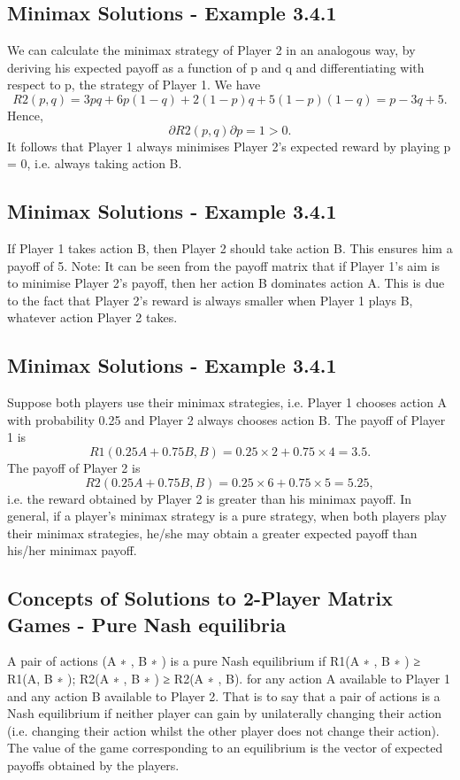 \documentclass[]{report}
\begin{document}
\subsection{Minimax Solutions - Example 3.4.1}
We can calculate the minimax strategy of Player 2 in an analogous
way, by deriving his expected payoff as a function of p and q and
differentiating with respect to p, the strategy of Player 1. We have
\[R2(p, q) = 3pq+6p(1−q)+2(1−p)q+5(1−p)(1−q) = p−3q+5.\]
Hence,
\[∂R2(p, q)
∂p
= 1 > 0.\]
It follows that Player 1 always minimises Player 2’s expected
reward by playing p = 0, i.e. always taking action B.
\subsection{Minimax Solutions - Example 3.4.1}
If Player 1 takes action B, then Player 2 should take action B.
This ensures him a payoff of 5.
Note: It can be seen from the payoff matrix that if Player 1’s aim
is to minimise Player 2’s payoff, then her action B dominates
action A.
This is due to the fact that Player 2’s reward is always smaller
when Player 1 plays B, whatever action Player 2 takes.
\subsection{Minimax Solutions - Example 3.4.1}
Suppose both players use their minimax strategies, i.e. Player 1
chooses action A with probability 0.25 and Player 2 always chooses
action B.
The payoff of Player 1 is
\[R1(0.25A + 0.75B, B) = 0.25 × 2 + 0.75 × 4 = 3.5.\]
The payoff of Player 2 is
\[R2(0.25A + 0.75B, B) = 0.25 × 6 + 0.75 × 5 = 5.25,\] i.e. the
reward obtained by Player 2 is greater than his minimax payoff.
In general, if a player’s minimax strategy is a pure strategy, when
both players play their minimax strategies, he/she may obtain a
greater expected payoff than his/her minimax payoff.
\subsection{Concepts of Solutions to 2-Player Matrix Games - Pure
Nash equilibria}
A pair of actions (A
∗
, B
∗
) is a pure Nash equilibrium if
R1(A
∗
, B
∗
) ≥ R1(A, B
∗
); R2(A
∗
, B
∗
) ≥ R2(A
∗
, B).
for any action A available to Player 1 and any action B available
to Player 2.
That is to say that a pair of actions is a Nash equilibrium if neither
player can gain by unilaterally changing their action (i.e. changing
their action whilst the other player does not change their action).
The value of the game corresponding to an equilibrium is the
vector of expected payoffs obtained by the players.
\end{document}
